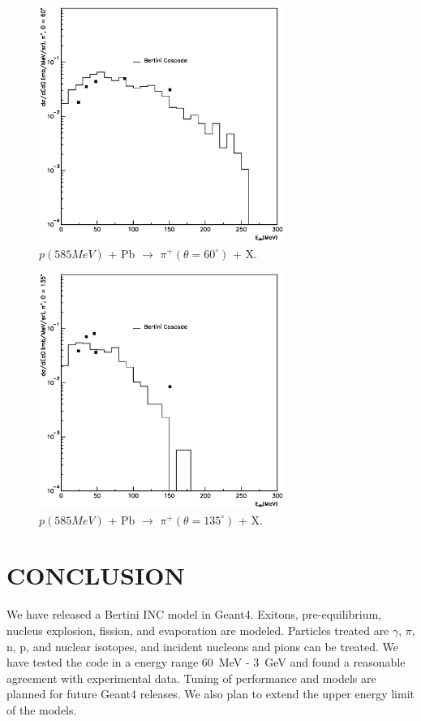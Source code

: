 \documentclass[twocolumn,twoside,slac,floatfix]{revtex4}
\begin{document}
\begin{figure}
  \includegraphics[width=80mm,keepaspectratio]{pn_pb_597_pip_a2.eps}
  \caption{$p(585 MeV)$ + Pb $\rightarrow$ $\pi^{+}(\theta = 60^{\circ})$ + X.}
  \label{pi60}
\end{figure}
 
\begin{figure}
  \includegraphics[width=80mm,keepaspectratio]{pn_pb_597_pip_a4.eps}
  \caption{$p(585 MeV)$ + Pb $\rightarrow$ $\pi^{+}(\theta = 135^{\circ})$ + X.}
  \label{pi135}
\end{figure}


\section{CONCLUSION}
We have released a Bertini INC model in Geant4.
Exitons, pre-equilibrium, nucleus explosion, fission, and evaporation are modeled.
Particles treated are $\gamma$, $\pi$, n, p, and nuclear isotopes, and incident nucleons and pions can be treated.
We have tested the code in a energy range 60~MeV - 3~GeV and found a reasonable agreement with
experimental data. Tuning of performance and models are planned for future Geant4 releases.
We also plan to extend the upper energy limit of the models.
\end{document}
